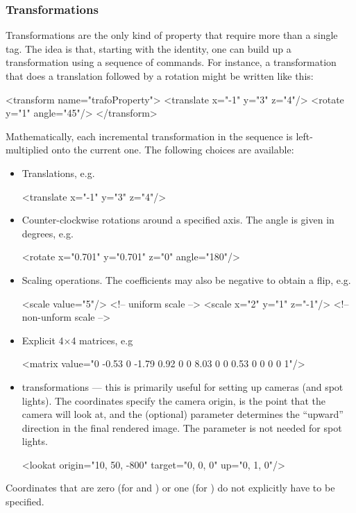 \subsubsection{Transformations}
Transformations are the only kind of property that require more than a single tag. The idea is that, starting
with the identity, one can build up a transformation using a sequence of commands. For instance, a transformation that
does a translation followed by a rotation might be written like this:
\begin{xml}
<transform name="trafoProperty">
    <translate x="-1" y="3" z="4"/>
    <rotate y="1" angle="45"/>
</transform>
\end{xml}
Mathematically, each incremental transformation in the sequence is left-multiplied onto the current one. The following
choices are available:
\begin{itemize}
\item Translations, e.g.
\begin{xml}
<translate x="-1" y="3" z="4"/>
\end{xml}
\item Counter-clockwise rotations around a specified axis. The angle is given in degrees, e.g.
\begin{xml}
<rotate x="0.701" y="0.701" z="0" angle="180"/>
\end{xml}
\item Scaling operations. The coefficients may also be negative to obtain a flip, e.g.
\begin{xml}
<scale value="5"/>           <!-- uniform scale -->
<scale x="2" y="1" z="-1"/>  <!-- non-unform scale -->
\end{xml}
\item Explicit 4$\times$4 matrices, e.g
\begin{xml}
<matrix value="0 -0.53 0 -1.79 0.92 0 0 8.03 0 0 0.53 0 0 0 0 1"/>
\end{xml}
\item {} transformations --- this is primarily useful for setting up cameras (and spot lights). The  coordinates
specify the camera origin,  is the point that the camera will look at, and the
(optional)  parameter determines the ``upward'' direction in the final rendered image.
The  parameter is not needed for spot lights.
\begin{xml}
<lookat origin="10, 50, -800" target="0, 0, 0" up="0, 1, 0"/>
\end{xml}
\end{itemize}
Coordinates that are zero (for  and ) or one (for )
do not explicitly have to be specified.
\newpage
